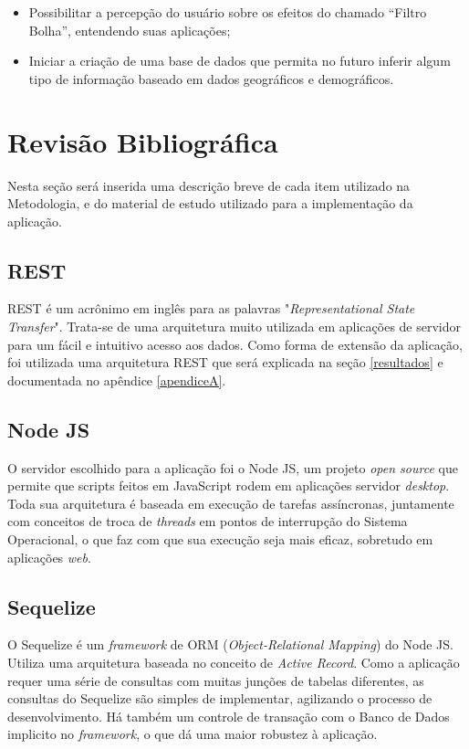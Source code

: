 \documentclass[
	12pt,				%
	oneside,			%
	a4paper,			%
	english,			%
	brazil				%
	]{abntex2ppgsi}
\begin{document}
\begin{itemize}
	\item{Possibilitar a percepção do usuário sobre os efeitos do chamado “Filtro Bolha”, entendendo suas aplicações;}
	\item{Iniciar a criação de uma base de dados que permita no futuro inferir algum tipo de informação baseado em dados geográficos e demográficos.}
\end{itemize}


\chapter{Revisão Bibliográfica}

Nesta seção será inserida uma descrição breve de cada item utilizado na Metodologia, e do material de estudo utilizado para a implementação da aplicação.

\section{REST}
REST é um acrônimo em inglês para as palavras "\textit{Representational State Transfer}". Trata-se de uma arquitetura muito utilizada em aplicações de servidor para um fácil e intuitivo acesso aos dados. Como forma de extensão da aplicação, foi utilizada uma arquitetura REST que será explicada na seção \ref{resultados} e documentada no apêndice \ref{apendiceA}.

\section{Node JS}
O servidor escolhido para a aplicação foi o Node JS, um projeto \textit{open source} que permite que scripts feitos em JavaScript rodem em aplicações servidor \textit{desktop}. Toda sua arquitetura é baseada em execução de tarefas assíncronas, juntamente com conceitos de troca de \textit{threads} em pontos de interrupção do Sistema Operacional, o que faz com que sua execução seja mais eficaz, sobretudo em aplicações \textit{web}.

\section{Sequelize}
O Sequelize é um \textit{framework} de ORM (\textit{Object-Relational Mapping}) do Node JS. Utiliza uma arquitetura baseada no conceito de \textit{Active Record}. Como a aplicação requer uma série de consultas com muitas junções de tabelas diferentes, as consultas do Sequelize são simples de implementar, agilizando o processo de desenvolvimento. Há também um controle de transação com o Banco de Dados implicito no \textit{framework}, o que dá uma maior robustez à aplicação. 
\end{document}
